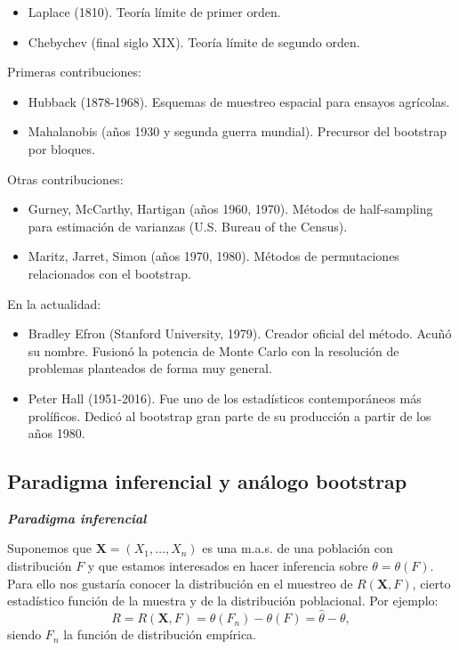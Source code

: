 \documentclass[]{book}
\theoremstyle{break}
\theoremstyle{definition}
\theoremstyle{definition}
\theoremstyle{definition}
\theoremstyle{remark}
\begin{document}
\begin{itemize}
\item
  Laplace (1810). Teoría límite de primer orden.
\item
  Chebychev (final siglo XIX). Teoría límite de segundo orden.
\end{itemize}

Primeras contribuciones:

\begin{itemize}
\item
  Hubback (1878-1968). Esquemas de muestreo espacial para ensayos
  agrícolas.
\item
  Mahalanobis (años 1930 y segunda guerra mundial). Precursor del
  bootstrap por bloques.
\end{itemize}

Otras contribuciones:

\begin{itemize}
\item
  Gurney, McCarthy, Hartigan (años 1960, 1970). Métodos de half-sampling
  para estimación de varianzas (U.S. Bureau of the Census).
\item
  Maritz, Jarret, Simon (años 1970, 1980). Métodos de permutaciones
  relacionados con el bootstrap.
\end{itemize}

En la actualidad:

\begin{itemize}
\item
  Bradley Efron (Stanford University, 1979). Creador oficial del método.
  Acuñó su nombre. Fusionó la potencia de Monte Carlo con la resolución
  de problemas planteados de forma muy general.
\item
  Peter Hall (1951-2016). Fue uno de los estadísticos contemporáneos más
  prolíficos. Dedicó al bootstrap gran parte de su producción a partir
  de los años 1980.
\end{itemize}

\subsection{Paradigma inferencial y análogo
bootstrap}\label{paradigma-inferencial-y-anuxe1logo-bootstrap}

\textbf{\emph{Paradigma inferencial}}

Suponemos que \(\mathbf{X}=\left( X_1,\ldots ,X_n \right)\) es una
m.a.s. de una población con distribución \(F\) y que estamos interesados
en hacer inferencia sobre \(\theta =\theta \left(F \right)\). Para ello
nos gustaría conocer la distribución en el muestreo de
\(R\left( \mathbf{X},F \right)\), cierto estadístico función de la
muestra y de la distribución poblacional. Por ejemplo:
\[R=R\left( \mathbf{X},F \right) =\theta \left( F_n \right) 
-\theta \left( F \right) = \hat \theta - \theta,\] siendo \(F_n\) la
función de distribución empírica.
\end{document}
